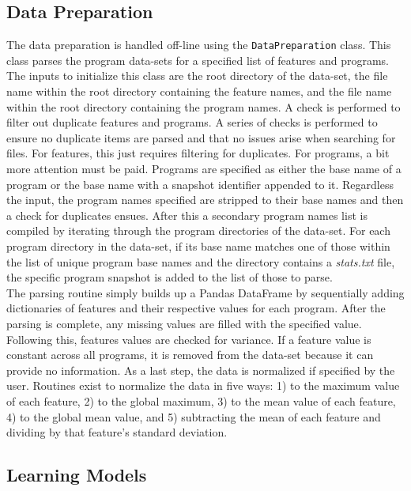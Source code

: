 \documentclass[paper=a4, fontsize=11pt]{scrartcl} %
\begin{document}
\subsection*{Data Preparation}

The data preparation is handled off-line using the \verb|DataPreparation| class.
This class parses the program data-sets for a specified list of features and programs.
The inputs to initialize this class are the root directory of the data-set, the file name within the root directory containing the feature names, and the file name within the root directory containing the program names.
A check is performed to filter out duplicate features and programs.
A series of checks is performed to ensure no duplicate items are parsed and that no issues arise when searching for files.
For features, this just requires filtering for duplicates.
For programs, a bit more attention must be paid.
Programs are specified as either the base name of a program or the base name with a snapshot identifier appended to it.
Regardless the input, the program names specified are stripped to their base names and then a check for duplicates ensues.
After this a secondary program names list is compiled by iterating through the program directories of the data-set.
For each program directory in the data-set, if its base name matches one of those within the list of unique program base names and the directory contains a {\em stats.txt} file, the specific program snapshot is added to the list of those to parse.
\\

The parsing routine simply builds up a Pandas DataFrame by sequentially adding dictionaries of features and their respective values for each program.
After the parsing is complete, any missing values are filled with the specified value.
Following this, features values are checked for variance.
If a feature value is constant across all programs, it is removed from the data-set because it can provide no information.
As a last step, the data is normalized if specified by the user.
Routines exist to normalize the data in five ways: 1) to the maximum value of each feature, 2) to the global maximum, 3) to the mean value of each feature, 4) to the global mean value, and 5) subtracting the mean of each feature and dividing by that feature's standard deviation.

\subsection*{Learning Models}
\end{document}
